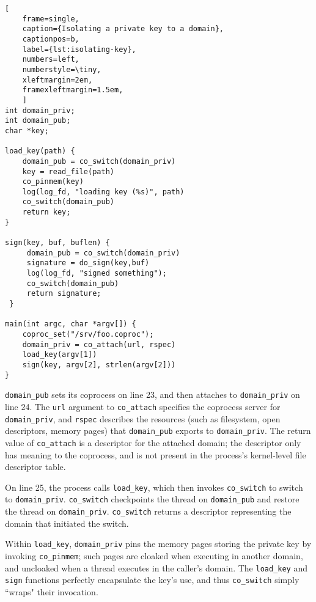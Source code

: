 \begin{lstlisting}[
    frame=single, 
    caption={Isolating a private key to a domain},
    captionpos=b,
    label={lst:isolating-key},
    numbers=left,
    numberstyle=\tiny,
    xleftmargin=2em,
    framexleftmargin=1.5em,
    ]
int domain_priv;
int domain_pub;
char *key;

load_key(path) {
    domain_pub = co_switch(domain_priv)
    key = read_file(path)
    co_pinmem(key)
    log(log_fd, "loading key (%s)", path)
    co_switch(domain_pub)
    return key;
}
 
sign(key, buf, buflen) {
     domain_pub = co_switch(domain_priv)
     signature = do_sign(key,buf)
     log(log_fd, "signed something");
     co_switch(domain_pub)
     return signature; 
 }

main(int argc, char *argv[]) {
    coproc_set("/srv/foo.coproc");
    domain_priv = co_attach(url, rspec)
    load_key(argv[1])
    sign(key, argv[2], strlen(argv[2]))
}
\end{lstlisting}


\texttt{domain\_pub} sets its coprocess on line 23, and then attaches to 
\texttt{domain\_priv} on line 24.
%
The \texttt{url} argument to \texttt{co\_attach} specifies the coprocess server
for \texttt{domain\_priv}, and \texttt{rspec} describes the resources (such as
filesystem, open descriptors, memory pages) that \texttt{domain\_pub} exports
to \texttt{domain\_priv}.
%
The return value of \texttt{co\_attach} is a descriptor for the attached
domain; the descriptor only has meaning to the coprocess, and is not present
in the process's kernel-level file descriptor table.


On line 25, the process calls \texttt{load\_key}, which then invokes
\texttt{co\_switch} to switch to \texttt{domain\_priv}.
%
\texttt{co\_switch} checkpoints the thread on \texttt{domain\_pub} and restore
the thread on \texttt{domain\_priv}.
%
\texttt{co\_switch} returns a descriptor representing the domain that
initiated the switch.


Within \texttt{load\_key}, \texttt{domain\_priv} pins the memory pages storing
the private key by invoking \texttt{co\_pinmem};
such pages are cloaked when executing in another
domain, and uncloaked when a thread executes in the caller's domain.
%
The \texttt{load\_key} and \texttt{sign}
functions perfectly encapsulate the key's use, and thus  \texttt{co\_switch}
simply ``wraps" their invocation.


